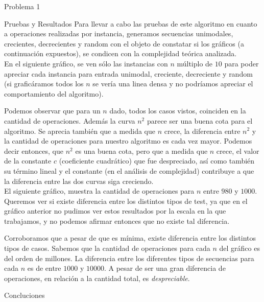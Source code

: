 \begin{section}{Problema 1}
\begin{subsection}{Pruebas y Resultados}
		Para llevar a cabo las pruebas de este algoritmo en cuanto a operaciones realizadas por instancia, generamos secuencias unimodales, crecientes, decrecientes y random con el objeto de constatar si los gráficos (a continuación expuestos), se condicen con la complejidad teórica analizada.\\

		En el siguiente gráfico, se ven sólo las instancias con $n$ múltiplo de $10$ para poder apreciar cada instancia para entrada unimodal, creciente, decreciente y random (si graficáramos todos los $n$ se vería una linea densa y no podríamos apreciar el comportamiento del algoritmo).

		
		Podemos observar que para un $n$ dado, todos los casos vistos, coinciden en la cantidad de operaciones. Además la curva $n^2$ parece ser una buena cota para el algoritmo. Se aprecia también que a medida que $n$ crece, la diferencia entre $n^2$ y la cantidad de operaciones para nuestro algoritmo es cada vez mayor. Podemos decir entonces, que $n^2$ es una buena cota, pero que a medida que $n$ crece, el valor de la constante $c$ (coeficiente cuadrático) que fue despreciado, así como también su término lineal y el constante  (en el análisis de complejidad) contribuye a que la diferencia entre las dos curvas siga creciendo.\\

		El siguiente gráfico, muestra la cantidad de operaciones para $n$ entre $980$ y $1000$. Queremos ver si existe diferencia entre los distintos tipos de test, ya que en el gráfico anterior no pudimos ver estos resultados por la escala en la que trabajamos, y no podemos afirmar entonces que no existe tal diferencia.\\


		Corroboramos que a pesar de que es mínima, existe diferencia entre los distintos tipos de casos. Sabemos que la cantidad de operaciones para cada $n$ del gráfico es del orden de millones. La diferencia entre los diferentes tipos de secuencias para cada $n$ es de entre $1000$ y $10000$. A pesar de ser una gran diferencia de operaciones, en relación a la cantidad total, es {\em despreciable}.

	\end{subsection}

	\begin{subsection}{Concluciones}


\end{subsection}
\end{section}

